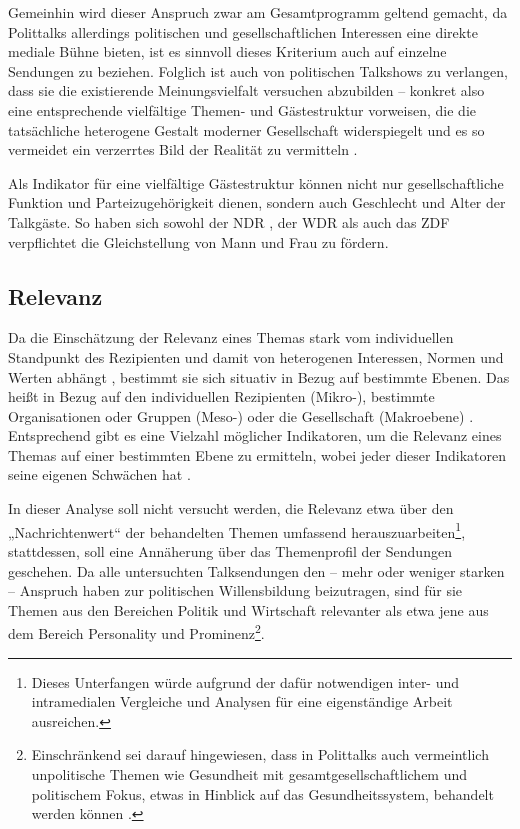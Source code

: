 Gemeinhin wird dieser Anspruch zwar am Gesamtprogramm geltend gemacht, da Polittalks allerdings politischen und gesellschaftlichen Interessen eine direkte mediale Bühne bieten, ist es sinnvoll dieses Kriterium auch auf einzelne Sendungen zu beziehen. Folglich ist auch von politischen Talkshows zu verlangen, dass sie die existierende Meinungsvielfalt versuchen abzubilden – konkret also eine entsprechende vielfältige Themen- und Gästestruktur vorweisen, die die tatsächliche heterogene Gestalt moderner Gesellschaft widerspiegelt und es so vermeidet ein verzerrtes Bild der Realität zu vermitteln \parencite[53–57]{plakeTalkshowsIndustrialisierungKommunikation1999}.

Als Indikator für eine vielfältige Gästestruktur können nicht nur gesellschaftliche Funktion und Parteizugehörigkeit dienen, sondern auch Geschlecht und Alter der Talkgäste. So haben sich sowohl der NDR \parencite[126]{schulzGesetzessammlungInformationKommunikation2012}, der WDR \parencite[§7 Abs. 4]{wdrGesetzUeberWestdeutschen2011} als auch das ZDF \parencite[2]{zdfRichtlinenFuerSendungen2009} verpflichtet die Gleichstellung von Mann und Frau zu fördern.

\subsection{Relevanz}

Da die Einschätzung der Relevanz eines Themas stark vom individuellen Standpunkt des Rezipienten und damit von heterogenen Interessen, Normen und Werten abhängt \parencite[698]{schatzQualitaetFernsehprogrammenKriterien1992}, bestimmt sie sich situativ in Bezug auf bestimmte Ebenen. Das heißt in Bezug auf den individuellen Rezipienten (Mikro-), bestimmte Organisationen oder Gruppen (Meso-) oder die Gesellschaft (Makroebene) \parencite[696]{schatzQualitaetFernsehprogrammenKriterien1992}. Entsprechend gibt es eine Vielzahl möglicher Indikatoren, um die Relevanz eines Themas auf einer bestimmten Ebene zu ermitteln, wobei jeder dieser Indikatoren seine eigenen Schwächen hat \parencite[697-701]{schatzQualitaetFernsehprogrammenKriterien1992}.

In dieser Analyse soll nicht versucht werden, die Relevanz etwa über den „Nachrichtenwert“ \parencite[237, passim]{lippmannOeffentlicheMeinung1990} der behandelten Themen umfassend herauszuarbeiten\footnote{Dieses Unterfangen würde aufgrund der dafür notwendigen inter- und intramedialen Vergleiche und Analysen für eine eigenständige Arbeit ausreichen.}, stattdessen, soll eine Annäherung über das Themenprofil der Sendungen geschehen. Da alle untersuchten Talksendungen den – mehr oder weniger starken – Anspruch haben zur politischen Willensbildung beizutragen, sind für sie Themen aus den Bereichen Politik und Wirtschaft relevanter als etwa jene aus dem Bereich Personality und Prominenz\footnote{Einschränkend sei darauf hingewiesen, dass in Polittalks auch vermeintlich unpolitische Themen wie Gesundheit mit gesamtgesellschaftlichem und politischem Fokus, etwas in Hinblick auf das Gesundheitssystem, behandelt werden können \parencite[86]{plakeTalkshowsIndustrialisierungKommunikation1999}.}.

